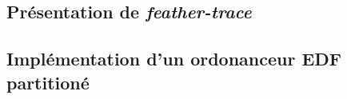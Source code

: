 \documentclass{article}
\begin{document}
    \subsection{Présentation de \textit{feather-trace}}
    
    \subsection{Implémentation d'un ordonanceur EDF partitioné}
    
    
    \newpage
    
    
    \newpage
    \listoffigures
    
    \printnoidxglossaries
    
\end{document}
